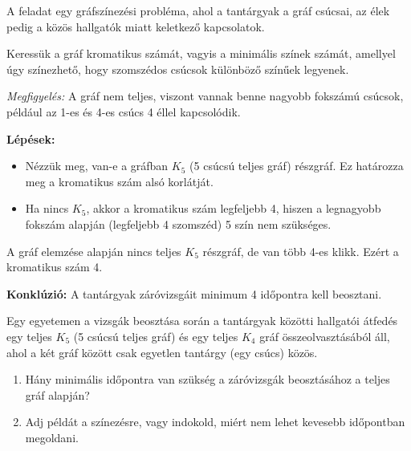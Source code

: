 \begin{solution}
	A feladat egy gráfszínezési probléma, ahol a tantárgyak a gráf csúcsai,
	az élek pedig a közös hallgatók miatt keletkező kapcsolatok.

Keressük a gráf kromatikus számát, vagyis a minimális színek számát,
amellyel úgy színezhető, hogy szomszédos csúcsok különböző színűek
legyenek.

\medskip{}

\textit{Megfigyelés:} A gráf nem teljes, viszont vannak benne nagyobb
fokszámú csúcsok, például az 1-es és 4-es csúcs 4 éllel kapcsolódik.

\medskip{}

\textbf{Lépések:}
\begin{itemize}
	\item Nézzük meg, van-e a gráfban $K_{5}$ (5 csúcsú teljes gráf) részgráf.
	Ez határozza meg a kromatikus szám alsó korlátját. 
	\item Ha nincs $K_{5}$, akkor a kromatikus szám legfeljebb 4, hiszen a
	legnagyobb fokszám alapján (legfeljebb 4 szomszéd) 5 szín nem szükséges. 
\end{itemize}
\medskip{}

A gráf elemzése alapján nincs teljes $K_{5}$ részgráf, de van több
4-es klikk. Ezért a kromatikus szám 4.

\medskip{}

\textbf{Konklúzió:} A tantárgyak záróvizsgáit minimum 4 időpontra
kell beosztani.
\end{solution}
\begin{extraproblem}
	Egy egyetemen a vizsgák beosztása során a tantárgyak közötti hallgatói
	átfedés egy teljes $K_{5}$ (5 csúcsú teljes gráf) és egy teljes $K_{4}$
	gráf összeolvasztásából áll, ahol a két gráf között csak egyetlen
	tantárgy (egy csúcs) közös.


\begin{enumerate}
	\item Hány minimális időpontra van szükség a záróvizsgák beosztásához a
	teljes gráf alapján? 
	\item Adj példát a színezésre, vagy indokold, miért nem lehet kevesebb időpontban
	megoldani. 
\end{enumerate}
\end{extraproblem}
